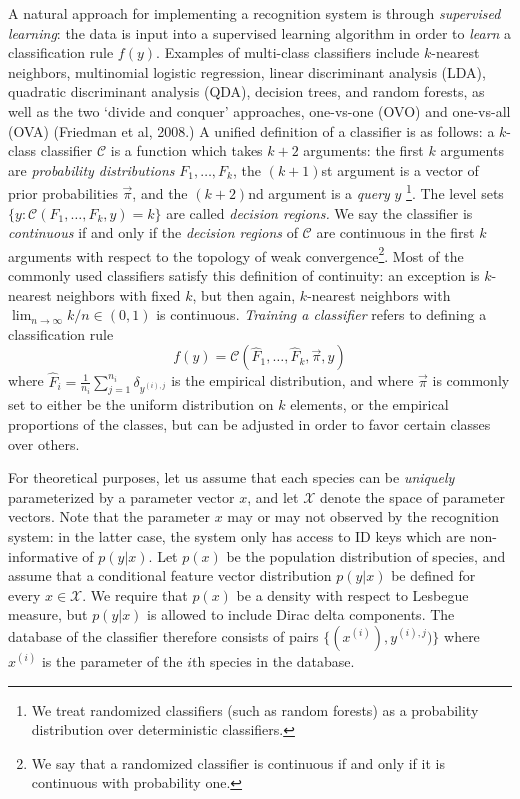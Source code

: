 \documentclass{article}
\begin{document}
A natural approach for implementing a recognition system is through \emph{supervised learning}:
the data is input into a supervised learning algorithm in order to \emph{learn} a classification rule $f(y)$.
Examples of multi-class classifiers include $k$-nearest neighbors, multinomial logistic regression, linear discriminant analysis (LDA), quadratic discriminant analysis (QDA), decision trees, and random forests, as well as the two
`divide and conquer' approaches, one-vs-one (OVO) and one-vs-all (OVA) (Friedman et al, 2008.)
A unified definition of a classifier is as follows: a $k$-class classifier $\mathcal{C}$ is a
function which takes $k+2$ arguments:
the first $k$ arguments are \emph{probability distributions} $F_1,\hdots, F_k$, 
the $(k+1)$st argument is a vector of prior probabilities $\vec{\pi}$,
and the $(k+2)$nd argument is a \emph{query} $y$
\footnote{We treat randomized classifiers (such as random forests) as a probability distribution over deterministic classifiers.}.
The level sets $\{y: \mathcal{C}(F_1,\hdots, F_k, y) = k\}$ are called \emph{decision regions.}
We say the classifier is \emph{continuous} if and only if the \emph{decision regions} of $\mathcal{C}$ are continuous in the first $k$ arguments with respect to the topology of weak convergence\footnote{We say that a randomized classifier is continuous if and only if it is continuous with probability one.}.
Most of the commonly used classifiers satisfy this definition of continuity: an exception is $k$-nearest neighbors with fixed $k$,
but then again, $k$-nearest neighbors with $\lim_{n \to \infty} k/n \in (0, 1)$ is continuous.
\emph{Training a classifier} refers to defining a classification rule
\[
f(y) = \mathcal{C}(\hat{F}_1,\hdots, \hat{F}_k, \vec{\pi}, y)
\]
where $\hat{F}_i = \frac{1}{n_i}\sum_{j=1}^{n_i} \delta_{y^{(i), j}}$ is the empirical distribution,
and where $\vec{\pi}$ is commonly set to either be the uniform distribution on $k$ elements, or the empirical proportions of the classes, but can be adjusted in order to favor certain classes over others.

For theoretical purposes,  let us assume that each species can be 
\emph{uniquely} parameterized by a parameter vector $x$,
and let $\mathcal{X}$ denote the space of parameter vectors.  Note that the parameter $x$ may or may not observed by
the recognition system: in the latter case, the system only has access to ID keys which are non-informative of $p(y|x)$.
Let $p(x)$ be the population distribution of species, and assume that a conditional
feature vector distribution $p(y|x)$ be defined for every $x \in
\mathcal{X}$.  We require that $p(x)$ be a density with respect to
Lesbegue measure, but $p(y|x)$ is allowed to include Dirac delta components.
The database of the classifier therefore consists of pairs $\{(x^{(i)}), y^{(i), j})\}$
where $x^{(i)}$ is the parameter of the $i$th species in the database.
\end{document}
